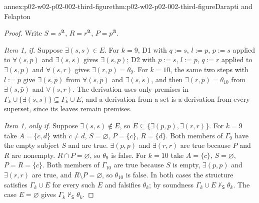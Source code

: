 \begin{annexitem}{annex:p02-w02-p02-002-third-figure}{thm:p02-w02-p02-002-third-figure}{Darapti and Felapton}
\begin{proof}
Write \(S=s^{\mathfrak A}\), \(R=r^{\mathfrak A}\), \(P=p^{\mathfrak A}\).

\emph{Item 1, if.} Suppose \(\exists(s,s)\in E\). For \(k=9\), D1 with
\(q:=s\), \(l:=p\), \(p:=s\) applied to \(\forall(s,p)\) and \(\exists(s,s)\)
gives \(\exists(s,p)\); D2 with \(p:=s\), \(l:=p\), \(q:=r\) applied to
\(\exists(s,p)\) and \(\forall(s,r)\) gives \(\exists(r,p)=\theta_9\).
For \(k=10\), the same two steps with \(l:=\bar p\) give
\(\exists(s,\bar p)\) from \(\forall(s,\bar p)\) and \(\exists(s,s)\), and
then \(\exists(r,\bar p)=\theta_{10}\) from \(\exists(s,\bar p)\) and
\(\forall(s,r)\). The derivation uses only premises in
\(\Gamma_k\cup\{\exists(s,s)\}\subseteq\Gamma_k\cup E\), and a derivation
from a set is a derivation from every superset, since its leaves remain
premises.

\emph{Item 1, only if.} Suppose \(\exists(s,s)\notin E\), so
\(E\subseteq\{\exists(p,p),\exists(r,r)\}\). For \(k=9\) take \(A=\{c,d\}\)
with \(c\ne d\), \(S=\varnothing\), \(P=\{c\}\), \(R=\{d\}\). Both members of
\(\Gamma_9\) have the empty subject \(S\) and are true.
\(\exists(p,p)\) and \(\exists(r,r)\) are true because \(P\) and \(R\) are
nonempty. \(R\cap P=\varnothing\), so \(\theta_9\) is false. For \(k=10\)
take \(A=\{c\}\), \(S=\varnothing\), \(P=R=\{c\}\). Both members of
\(\Gamma_{10}\) are true because \(S\) is empty, \(\exists(p,p)\) and
\(\exists(r,r)\) are true, and \(R\setminus P=\varnothing\), so
\(\theta_{10}\) is false. In both cases the structure satisfies
\(\Gamma_k\cup E\) for every such \(E\) and falsifies \(\theta_k\);
by soundness \(\Gamma_k\cup E\nvdash_{\mathsf S}\theta_k\). The case
\(E=\varnothing\) gives \(\Gamma_k\nvdash_{\mathsf S}\theta_k\).


\end{proof}
\end{annexitem}
